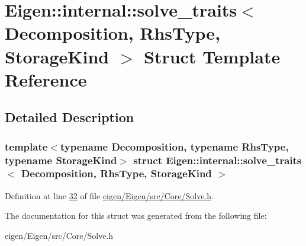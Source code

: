 \hypertarget{struct_eigen_1_1internal_1_1solve__traits}{}\section{Eigen\+:\+:internal\+:\+:solve\+\_\+traits$<$ Decomposition, Rhs\+Type, Storage\+Kind $>$ Struct Template Reference}
\label{struct_eigen_1_1internal_1_1solve__traits}


\subsection{Detailed Description}
\subsubsection*{template$<$typename Decomposition, typename Rhs\+Type, typename Storage\+Kind$>$\newline
struct Eigen\+::internal\+::solve\+\_\+traits$<$ Decomposition, Rhs\+Type, Storage\+Kind $>$}



Definition at line \hyperlink{eigen_2_eigen_2src_2_core_2_solve_8h_source_l00032}{32} of file \hyperlink{eigen_2_eigen_2src_2_core_2_solve_8h_source}{eigen/\+Eigen/src/\+Core/\+Solve.\+h}.



The documentation for this struct was generated from the following file\+:\begin{DoxyCompactItemize}
\item 
eigen/\+Eigen/src/\+Core/\+Solve.\+h\end{DoxyCompactItemize}
